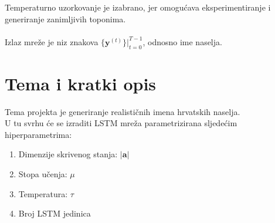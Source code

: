 \documentclass{report}
\begin{document}
Temperaturno uzorkovanje je izabrano, jer omogućava eksperimentiranje i generiranje zanimljivih toponima.\\
\\
Izlaz mreže je niz znakova $\{\mathbf{y}^{(t)}\} \biggr \rvert_{t=0}^{T-1}$, odnosno ime naselja.

\section{Tema i kratki opis}
Tema projekta je generiranje realističnih imena hrvatskih naselja.\\
U tu svrhu će se izraditi LSTM mreža parametrizirana sljedećim hiperparametrima:
\begin{enumerate}
\item Dimenzije skrivenog stanja: $\lvert \mathbf{a} \rvert$
\item Stopa učenja: $\mu$
\item Temperatura: $\tau$
\item Broj LSTM jedinica
\end{enumerate}
\end{document}
